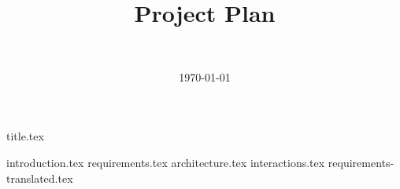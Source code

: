 \documentclass[final]{report}
\title{Project Plan}
\author{~}
\date{\today}
\begin{document}

{title.tex}
\newpage
\tableofcontents

\newpage
{}
{introduction.tex}
{requirements.tex}
{architecture.tex}
{interactions.tex}
{requirements-translated.tex}
\newpage
{}

\end{document}
